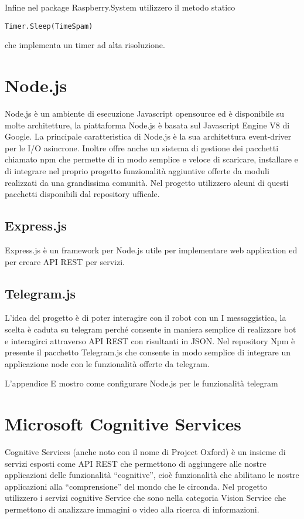 Infine nel package Raspberry.System utilizzero il metodo statico
\begin{lstlisting}[frame=none]
Timer.Sleep(TimeSpam)
\end{lstlisting}
che implementa un timer ad alta risoluzione.


\section{Node.js}

Node.js è un ambiente di esecuzione Javascript  opensource ed è disponibile su molte architetture, la piattaforma Node.js è basata sul Javascript Engine V8 di Google.
La principale caratteristica di Node.js è la sua  architettura event-driver per le I/O asincrone.
Inoltre offre anche un sistema di gestione dei pacchetti chiamato npm che permette di  in modo semplice e veloce di scaricare, installare e di integrare nel proprio progetto funzionalità aggiuntive offerte da moduli realizzati da una grandissima comunità.
Nel progetto utilizzero alcuni di questi pacchetti disponibili dal repository ufficale.


\subsection{Express.js}
Express.js è un framework per Node.js utile per implementare web application ed per creare API REST per servizi. 
\subsection{Telegram.js}
L’idea del progetto è di poter interagire con il robot con un I messaggistica, la scelta è caduta su telegram perché consente in maniera semplice di realizzare bot e interagirci attraverso API REST con risultanti in JSON. Nel repository Npm è presente il pacchetto Telegram.js che consente in modo semplice di integrare un applicazione node con le funzionalità offerte da telegram.

L'appendice E mostro come configurare Node.js per le funzionalità telegram

\section{Microsoft Cognitive Services} 
Cognitive Services (anche noto con il nome di Project Oxford) è un insieme di servizi esposti come API REST che permettono di aggiungere alle nostre applicazioni delle funzionalità “cognitive”, cioè funzionalità che abilitano le nostre applicazioni alla “comprensione” del mondo che le circonda. Nel progetto utilizzero i servizi cognitive Service che sono nella categoria Vision Service  che permettono di analizzare immagini o video alla ricerca di informazioni. 



